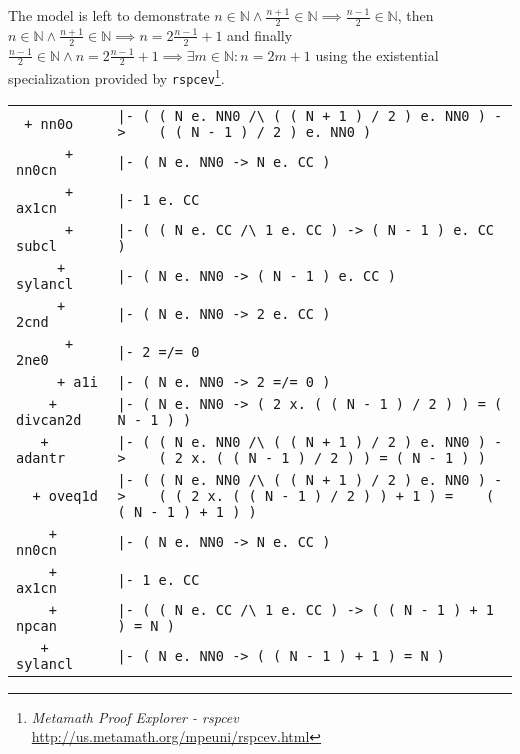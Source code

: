 \documentclass{article}
\begin{document}
The model is left to demonstrate $n \in \mathbb{N} \land \frac{n+1}{2} \in \mathbb{N} \implies \frac{n-1}{2} \in \mathbb{N}$, then $n \in \mathbb{N} \land \frac{n+1}{2} \in \mathbb{N} \implies n = 2\frac{n-1}{2}+1$ and finally $\frac{n-1}{2} \in \mathbb{N} \land n = 2\frac{n-1}{2}+1 \implies \exists m \in \mathbb{N}: n = 2m+1$ using the existential specialization provided by \verb|rspcev|\footnote{\textit{Metamath Proof Explorer - rspcev} \url{http://us.metamath.org/mpeuni/rspcev.html}}.

\begin{tabular}{ |l|p{105mm}| }
\hline
\verb| + nn0o       | & \verb!|- ( ( N e. NN0 /\ ( ( N + 1 ) / 2 ) e. NN0 ) -> !\newline\verb!   ( ( N - 1 ) / 2 ) e. NN0 )! \\
\verb|      + nn0cn | & \verb!|- ( N e. NN0 -> N e. CC )! \\
\verb|      + ax1cn | & \verb!|- 1 e. CC! \\
\verb|      + subcl | & \verb!|- ( ( N e. CC /\ 1 e. CC ) -> ( N - 1 ) e. CC )! \\
\verb|     + sylancl| & \verb!|- ( N e. NN0 -> ( N - 1 ) e. CC )! \\
\verb|     + 2cnd   | & \verb!|- ( N e. NN0 -> 2 e. CC )! \\
\verb|      + 2ne0  | & \verb!|- 2 =/= 0! \\
\verb|     + a1i    | & \verb!|- ( N e. NN0 -> 2 =/= 0 )! \\
\verb|    + divcan2d| & \verb!|- ( N e. NN0 -> ( 2 x. ( ( N - 1 ) / 2 ) ) = ( N - 1 ) )! \\
\verb|   + adantr   | & \verb!|- ( ( N e. NN0 /\ ( ( N + 1 ) / 2 ) e. NN0 ) -> !\newline\verb!   ( 2 x. ( ( N - 1 ) / 2 ) ) = ( N - 1 ) )! \\
\verb|  + oveq1d    | & \verb!|- ( ( N e. NN0 /\ ( ( N + 1 ) / 2 ) e. NN0 ) -> !\newline\verb!   ( ( 2 x. ( ( N - 1 ) / 2 ) ) + 1 ) = !\newline\verb!   ( ( N - 1 ) + 1 ) )! \\
\verb|    + nn0cn   | & \verb!|- ( N e. NN0 -> N e. CC )! \\
\verb|    + ax1cn   | & \verb!|- 1 e. CC! \\
\verb|    + npcan   | & \verb!|- ( ( N e. CC /\ 1 e. CC ) -> ( ( N - 1 ) + 1 ) = N )! \\
\verb|   + sylancl  | & \verb!|- ( N e. NN0 -> ( ( N - 1 ) + 1 ) = N )! \\

\end{tabular}
\end{document}

